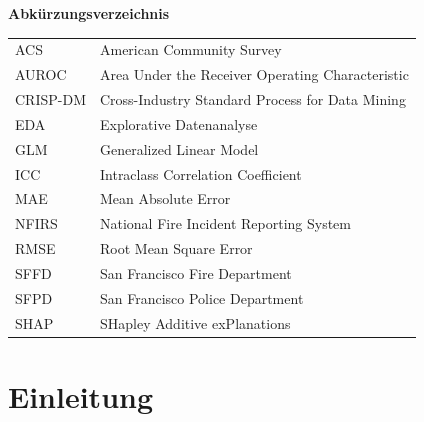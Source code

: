 \documentclass[12pt,a4paper]{article}
\begin{document}

\newpage
\tableofcontents

\newpage
\listoffigures

\newpage
{}
{\bfseries\normalsize Abkürzungsverzeichnis}
\vspace{6pt}

\begin{tabular}{@{}ll}
ACS & American Community Survey \\[12pt]
AUROC & Area Under the Receiver Operating Characteristic \\[12pt]
CRISP-DM & Cross-Industry Standard Process for Data Mining \\[12pt]
EDA & Explorative Datenanalyse \\[12pt]
GLM & Generalized Linear Model \\[12pt]
ICC & Intraclass Correlation Coefficient \\[12pt]
MAE & Mean Absolute Error \\[12pt]
NFIRS & National Fire Incident Reporting System \\[12pt]
RMSE & Root Mean Square Error \\[12pt]
SFFD & San Francisco Fire Department \\[12pt]
SFPD & San Francisco Police Department \\[12pt]
SHAP & SHapley Additive exPlanations \\[12pt]
\end{tabular}


\newpage
\listoftables

\newpage
{}
{}
\listofformeln

\newpage
{}
\setcounter{page}{1}

\section{Einleitung}
\end{document}

